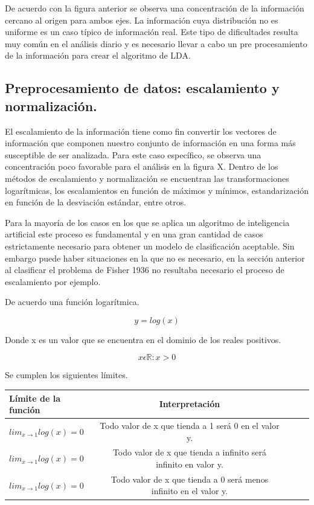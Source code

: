 \documentclass[letterpaper,12pt, spanish, oneside]{book} %
\begin{document}
De acuerdo con la figura anterior se observa una concentración de la información cercano al origen para ambos ejes. La información cuya distribución no es uniforme es un caso típico de información real. Este tipo de dificultades resulta muy común en el análisis diario y es necesario llevar a cabo un pre procesamiento de la información para crear el algoritmo de LDA.

\subsection{Preprocesamiento de datos: escalamiento y normalización.}

El escalamiento de la información tiene como fin convertir los vectores de información que componen nuestro conjunto de información en una forma más susceptible de ser analizada. Para este caso específico, se observa una concentración poco favorable para el análisis en la figura X. Dentro de los métodos de escalamiento y normalización se encuentran las transformaciones logarítmicas, los escalamientos en función de máximos y mínimos, estandarización en función de la desviación estándar, entre otros. 

Para la mayoría de los casos en los que se aplica un algoritmo de inteligencia artificial este proceso es fundamental y en una gran cantidad de casos estrictamente necesario para obtener un modelo de clasificación aceptable. Sin embargo puede haber situaciones en la que no es necesario, en la sección anterior al clasificar el problema de Fisher 1936 no resultaba necesario el proceso de escalamiento por ejemplo.

De acuerdo una función logarítmica.

$$ y = log(x) $$

Donde x es un valor que se encuentra en el dominio de los reales positivos.

$$ x  \epsilon \mathbb{R} : x > 0 $$

Se cumplen los siguientes límites.

\begin{table}[H]
\centering
\label{my-label}
\begin{tabular}{lclcl}
\hline
Límite de la función              & Interpretación                                                   \\
\hline
$lim_{x\rightarrow 1} log(x) = 0$ & {\footnotesize Todo valor de x que tienda a 1 será 0 en el valor y.}  \\
\hline
$lim_{x\rightarrow 1} log(x) = 0$ & {\footnotesize Todo valor de x que tienda a infinito será infinito en valor y.} \\
\hline
$lim_{x\rightarrow 1} log(x) = 0$ & {\footnotesize Todo valor de x que tienda a 0 será menos infinito en el valor y.}\\
\hline
\end{tabular}
\end{table}
\end{document}
